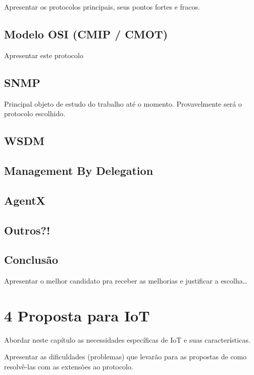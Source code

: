 \documentclass[twoside,english,brazilian]{UNISINOSmonografia}
\begin{document}
	Apresentar os protocolos principais, seus pontos fortes e fracos.
	
	
	
	\section{Modelo OSI (CMIP / CMOT)}

		Apresentar este protocolo
		
		
		
	\section{SNMP}

		Principal objeto de estudo do trabalho até o momento.
		Provavelmente será o protocolo escolhido.
		
		
	
	\section{WSDM}
	
	
	\section{Management By Delegation}
	
	
	\section{AgentX}
	
	
	\section{Outros?!}
	
	
	\section{Conclusão}
	
		Apresentar o melhor candidato pra receber as melhorias e justificar
		a escolha\ldots



\chapter{4 Proposta para IoT}

	Abordar neste capítulo as necessidades específicas de IoT e suas 
	características.
	
	Apresentar as dificuldades (problemas) que levarão para as propostas
	de como resolvê-las com as extensões ao protocolo.
	
\end{document}
